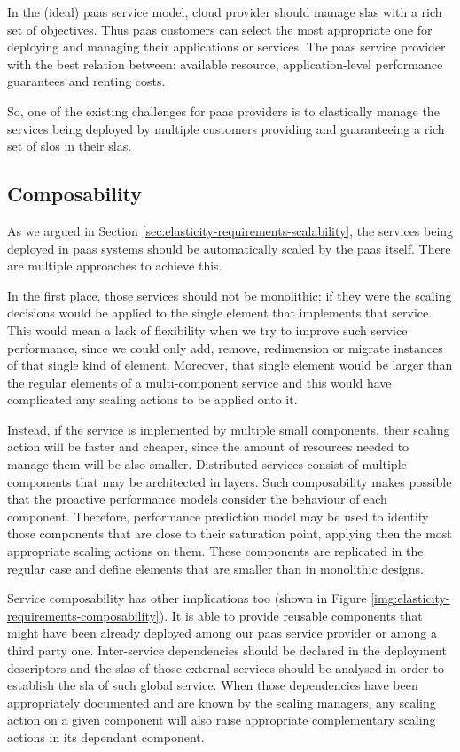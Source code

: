 In the (ideal) \ac{paas} service model, cloud provider should manage \ac{sla}s with a rich set of objectives.
Thus \ac{paas} customers can select the most appropriate one for deploying and managing their applications
or services. The \ac{paas} service provider with the best relation between: available resource,
application-level performance guarantees and renting costs.

So, one of the existing challenges for \ac{paas} providers is to elastically manage the services being
deployed by multiple customers providing and guaranteeing a rich set of \ac{slo}s in their \ac{sla}s.

\subsection{Composability}
\label{sec:elasticity-requirements-composability}
As we argued in Section \ref{sec:elasticity-requirements-scalability}, the services being deployed in
\ac{paas} systems should be automatically scaled by the \ac{paas} itself. There are multiple approaches
to achieve this.

In the first place, those services should not be monolithic; if they were the scaling decisions would
be applied to the single element that implements that service. This would mean a lack of flexibility
when we try to improve such service performance, since we could only add, remove, redimension or migrate
instances of that single kind of element. Moreover, that single element would be larger than the regular
elements of a multi-component service and this would have complicated any scaling actions to be applied
onto it.

Instead, if the service is implemented by multiple small components, their scaling action will be faster
and cheaper, since the amount of resources needed to manage them will be also smaller.
Distributed services consist of multiple components that may be architected in layers. Such composability
makes possible that the proactive performance models consider the behaviour of each component. Therefore,
performance prediction model may be used to identify those components that are close to their saturation
point, applying then the most appropriate scaling actions on them. These components are replicated in
the regular case and define elements that are smaller than in monolithic designs.

Service composability has other implications too (shown in Figure \ref{img:elasticity-requirements-composability}).
It is able to provide reusable components that might have been already deployed among our \ac{paas} service provider
or among a third party one. Inter-service dependencies should be declared in the deployment descriptors and the
\ac{sla}s of those external services should be analysed in order to establish the \ac{sla} of such global service.
When those dependencies have been appropriately documented and are known by the scaling managers, any scaling
action on a given component will also raise appropriate complementary scaling actions in its dependant
component.


